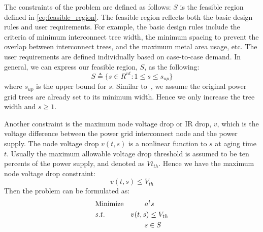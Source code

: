   The constraints of the problem are defined as follows: $S$ is the
  feasible region defined in \eqref{eq:feasible_region}. The feasible
  region reflects both the basic design rules and user
  requirements. For example, the basic design rules include the
  criteria of minimum interconnect tree width, the minimum spacing
  to prevent the overlap between interconnect trees, and the maximum
  metal area usage, etc. The user requirements are defined
  individually based on case-to-case demand. In general, we can
  express our feasible region, $S$, as the following:
\begin{equation}
	\label{eq:feasible_region}
S \triangleq \{ s \in R^{nt}: 1 \leq s \leq s_{up} \}
\end{equation}
where $s_{up}$ is the upper bound for $s$. Similar to~\cite{Sukharev:2019pg}, we assume the original power grid trees are
already set to its minimum width. Hence we only increase the tree
width and $s \geq 1 $.

Another constraint is the maximum node voltage drop or IR drop, $v$, which is the voltage difference between the power grid interconnect node and the
power supply. The node voltage drop $v(t,s)$ is a nonlinear function
to $s$ at aging time $t$. Usually the maximum allowable voltage drop
threshold is assumed to be ten percents of the power supply, and
denoted as $Vt_{th}$. Hence we have the maximum node voltage drop
constraint:
\begin{equation}
\label{eq:max_voltage}
v(t,s) \leq V_{th}
\end{equation} 
Then the problem can be formulated as:
\begin{align}
\label{eq:prob_formulation}
&\mbox{Minimize} & a^{t}s \qquad   \notag  \\
&s.t.     & v(t,s)\leq V_{th} \\
& \quad   & s \in S \quad          \notag
\end{align}

